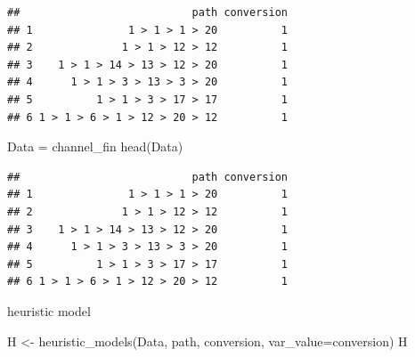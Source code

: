 \documentclass[
]{book}
\newenvironment{Shaded}{\begin{snugshade}}{\end{snugshade}}
\newcommand{\AttributeTok}[1]{\textcolor[rgb]{0.77,0.63,0.00}{#1}}
\newcommand{\FunctionTok}[1]{\textcolor[rgb]{0.00,0.00,0.00}{#1}}
\newcommand{\NormalTok}[1]{#1}
\newcommand{\OtherTok}[1]{\textcolor[rgb]{0.56,0.35,0.01}{#1}}
\newcommand{\StringTok}[1]{\textcolor[rgb]{0.31,0.60,0.02}{#1}}
\begin{document}
\begin{verbatim}
##                           path conversion
## 1               1 > 1 > 1 > 20          1
## 2              1 > 1 > 12 > 12          1
## 3    1 > 1 > 14 > 13 > 12 > 20          1
## 4      1 > 1 > 3 > 13 > 3 > 20          1
## 5          1 > 1 > 3 > 17 > 17          1
## 6 1 > 1 > 6 > 1 > 12 > 20 > 12          1
\end{verbatim}

\begin{Shaded}
\begin{Highlighting}[]
\NormalTok{Data }\OtherTok{=}\NormalTok{ channel\_fin}
\FunctionTok{head}\NormalTok{(Data)}
\end{Highlighting}
\end{Shaded}

\begin{verbatim}
##                           path conversion
## 1               1 > 1 > 1 > 20          1
## 2              1 > 1 > 12 > 12          1
## 3    1 > 1 > 14 > 13 > 12 > 20          1
## 4      1 > 1 > 3 > 13 > 3 > 20          1
## 5          1 > 1 > 3 > 17 > 17          1
## 6 1 > 1 > 6 > 1 > 12 > 20 > 12          1
\end{verbatim}

heuristic model

\begin{Shaded}
\begin{Highlighting}[]
\NormalTok{H }\OtherTok{\textless{}{-}} \FunctionTok{heuristic\_models}\NormalTok{(Data, }\StringTok{\textquotesingle{}path\textquotesingle{}}\NormalTok{, }\StringTok{\textquotesingle{}conversion\textquotesingle{}}\NormalTok{, }\AttributeTok{var\_value=}\StringTok{\textquotesingle{}conversion\textquotesingle{}}\NormalTok{)}
\NormalTok{H}
\end{Highlighting}
\end{Shaded}
\end{document}
